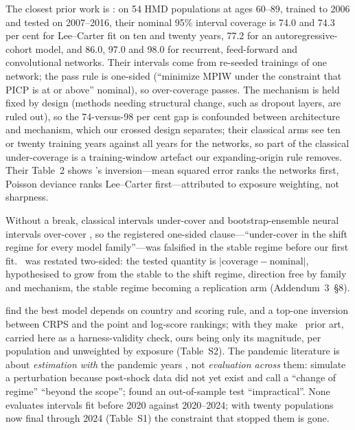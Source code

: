 The closest prior work is \citet{schnurch2022point}: on 54 HMD populations at ages
60--89, trained to 2006 and tested on 2007--2016, their nominal 95\% interval
coverage is 74.0 and 74.3 per cent for Lee--Carter fit on ten and twenty years,
77.2 for an autoregressive-cohort model, and 86.0, 97.0 and 98.0 for recurrent,
feed-forward and convolutional networks. Their intervals come from re-seeded
trainings of one network; the pass rule is one-sided (``minimize MPIW under the
constraint that PICP is at or above'' nominal), so over-coverage passes. The
mechanism is held fixed by design (methods needing structural change, such as
dropout layers, are ruled out), so the 74-versus-98 per cent gap is confounded between architecture and mechanism, which our crossed design
separates; their classical arms see ten or twenty training years against all
years for the networks, so part of the classical under-coverage is a
training-window artefact our expanding-origin rule removes. Their Table~2 shows
\Hone's inversion---mean squared error ranks the networks first, Poisson deviance
ranks Lee--Carter first---attributed to exposure weighting, not sharpness.

Without a break, classical intervals under-cover and bootstrap-ensemble
neural intervals over-cover \citep{schnurch2022point,marino2023neural}, so the
registered one-sided clause---``under-cover in the shift regime for every model
family''---was falsified in the stable regime before our first fit. \Htwo\ was
restated two-sided: the tested quantity is $|\text{coverage}-\text{nominal}|$,
hypothesised to grow from the stable to the shift regime, direction free by family
and mechanism, the stable regime becoming a replication arm (Addendum~3~\S8).

\citet{barigou2023bayesian} find the best model depends on country and scoring
rule, and \citet{goes2025bayesian} a top-one inversion between CRPS and the point
and log-score rankings; with \citet{schnurch2022point} they make
\Hone\ prior art, carried here as a harness-validity check, ours being only its
magnitude, per population and unweighted by exposure (Table~S2). The pandemic
literature is about \emph{estimation with} the pandemic years
\citep{cairns2020impact,robben2022assessing,goes2025bayesian,robben2024catastrophe,vanberkum2025estimating,nalmpatian2023advanced,robben2025granular},
not \emph{evaluation across} them: \citet{barigou2023bayesian} simulate a
perturbation because post-shock data did not yet exist and call a ``change of
regime'' ``beyond the scope''; \citet{goes2025bayesian} found an out-of-sample test
``impractical''. None evaluates intervals fit before 2020 against 2020--2024; with
twenty populations now final through 2024 (Table~S1) the constraint that stopped
them is gone.

